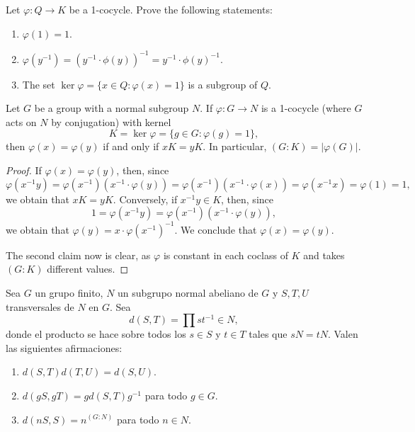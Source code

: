 \begin{exercise}
\label{xca:1cocycle}
Let $\varphi\colon Q\to K$ be a 1-cocycle. Prove the following statements:
\begin{enumerate}
	\item $\varphi(1)=1$.
	\item $\varphi(y^{-1})=(y^{-1}\cdot\phi(y))^{-1}=y^{-1}\cdot\phi(y)^{-1}$.
	\item The set $\ker\varphi=\{x\in Q:\varphi(x)=1\}$ is a subgroup of $Q$. 
\end{enumerate}
\end{exercise}

\begin{lemma}
\label{lem:1cocycle}
Let $G$ be a group with a normal subgroup $N$. 
If $\varphi\colon G\to N$ is a 1-cocycle (where $G$ acts on $N$ by conjugation)
with kernel 
\[
K=\ker\varphi=\{g\in G:\varphi(g)=1\}, 
\]
then 
$\varphi(x)=\varphi(y)$ if and only if $xK=yK$. In particular,
$(G:K)=|\varphi(G)|$. 
\end{lemma}

\begin{proof}
If $\varphi(x)=\varphi(y)$, then, since  
\[
\varphi(x^{-1}y)
=\varphi(x^{-1})(x^{-1}\cdot\varphi(y))
=\varphi(x^{-1})(x^{-1}\cdot\varphi(x))
=\varphi(x^{-1}x)=\varphi(1)
=1,
\]
we obtain that $xK=yK$. Conversely, if $x^{-1}y\in K$, then, since 
\[
1=\varphi(x^{-1}y)=\varphi(x^{-1})(x^{-1}\cdot \varphi(y)),
\]
we obtain that $\varphi(y)=x\cdot\varphi(x^{-1})^{-1}$. We conclude that 
$\varphi(x)=\varphi(y)$.

The second claim now is clear, as $\varphi$ is constant in each coclass of $K$ 
and takes $(G:K)$ different values. 
\end{proof}

\begin{lemma}
	\label{lemma:d}
	Sea $G$ un grupo finito, $N$ un subgrupo normal abeliano de $G$ y $S,T,U$
	transversales de $N$ en $G$. Sea 
	\[
	d(S,T)=\prod st^{-1}\in N,
	\]
	donde el producto se hace sobre todos los $s\in S$ y $t\in T$ tales que
	$sN=tN$. Valen las siguientes afirmaciones:
	\begin{enumerate}
		\item $d(S,T)d(T,U)=d(S,U)$.
		\item $d(gS,gT)=gd(S,T)g^{-1}$ para todo $g\in G$.
		\item $d(nS,S)=n^{(G:N)}$ para todo $n\in N$.
	\end{enumerate}
\end{lemma}

